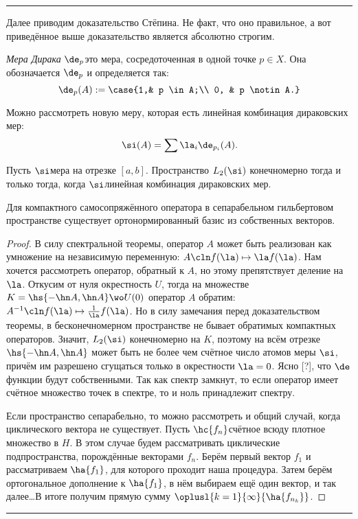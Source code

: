 \documentclass[a4paper]{article}
\newenvironment{petit}
{\par \smallskip \hrule \smallskip \footnotesize}
{\par \smallskip \hrule \smallskip}
\begin{document}
\begin{petit}
Далее приводим доказательство Стёпина. Не факт, что оно правильное, а вот приведённое выше доказательство
является абсолютно строгим.

\begin{df}
\emph{Мера Дирака} $\de_p$\т это мера, сосредоточенная в одной точке $p \in X$.
Она обозначается $\de_p$ и определяется так:
$$\de_p(A) := \case{1,& p \in A;\\ 0, & p \notin A.}$$
\end{df}
Можно рассмотреть новую меру, которая есть линейная комбинация дираковских мер:
$$\si(A)= \sum \la_i \de_{p_i}(A).$$

\begin{note}
Пусть $\si$\т мера на отрезке $[a,b]$. Пространство $L_2(\si)$ конечномерно тогда и только
тогда, когда $\si$\д линейная комбинация дираковских мер.
\end{note}

\begin{theorem}[Гильберта]
Для компактного самосопряжённого оператора в сепарабельном гильбертовом пространстве
существует ортонормированный базис из собственных векторов.
\end{theorem}
\begin{proof}
В силу спектральной теоремы, оператор $A$ может быть реализован как умножение на независимую
переменную: $A\cln f(\la) \mapsto \la f(\la)$. Нам хочется рассмотреть оператор, обратный к $A$,
но этому препятствует деление на $\la$. Откусим от нуля окрестность $U$, тогда на множестве
$K = \hs{-\hn A, \hn A} \wo U(0)$ оператор $A$ обратим: $A^{-1}\cln f(\la) \mapsto \frac{1}{\la}f(\la)$.
Но в силу замечания перед доказательством теоремы, в бесконечномерном пространстве не
бывает обратимых компактных операторов. Значит, $L_2(\si)$ конечномерно на $K$,
поэтому на всём отрезке $\hs{-\hn A, \hn A}$ может быть не более чем счётное число атомов меры $\si$,
причём им разрешено сгущаться только в окрестности $\la = 0$. Ясно [?], что $\de$\д функции будут собственными.
Так как спектр замкнут, то если оператор имеет счётное множество точек в спектре, то и ноль принадлежит спектру.

Если пространство сепарабельно, то можно рассмотреть и общий случай, когда циклического вектора не существует.
Пусть $\hc{f_n}$\т счётное всюду плотное множество в $H$. В этом случае будем рассматривать циклические
подпространства, порождённые векторами $f_n$. Берём первый вектор $f_1$ и рассматриваем $\ha{f_1}$,
для которого проходит наша процедура. Затем берём ортогональное дополнение к $\ha{f_1}$,
в нём выбираем ещё один вектор, и так далее\ldots В итоге получим прямую сумму
$\oplusl{k=1}{\infty}{\ha{f_{n_k}}}$.
\end{proof}

\end{petit}
\end{document}
